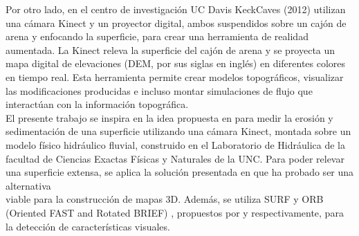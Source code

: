 Por otro lado, en el centro de investigación UC Davis KeckCaves (2012) \cite{arsandbox} utilizan una cámara Kinect y un proyector digital, ambos suspendidos sobre un cajón de arena y enfocando la superficie, para crear una herramienta de realidad aumentada. La Kinect releva la superficie del cajón de arena y se proyecta un mapa digital de elevaciones (DEM, por sus siglas en inglés) en diferentes colores en tiempo real. Esta herramienta permite crear modelos topográficos, visualizar las modificaciones producidas e incluso montar simulaciones de flujo que interactúan con la información topográfica. \\
El presente trabajo se inspira en la idea propuesta en \cite{arsandbox} para medir la erosión y sedimentación de una superficie utilizando una cámara Kinect, montada sobre un modelo físico hidráulico fluvial, construido en el Laboratorio de Hidráulica de la facultad de Ciencias Exactas Físicas y Naturales de la UNC. Para poder relevar una superficie extensa, se aplica la solución presentada en \cite{henry2010rgb} que ha probado ser una alternativa \\viable para la construcción de mapas 3D. Además, se utiliza SURF y ORB (Oriented FAST and Rotated BRIEF) \cite{RubleeRKB11}, propuestos por \cite{engelhard2011real} y \cite{fioraio2011realtime} respectivamente, para la detección de características visuales.